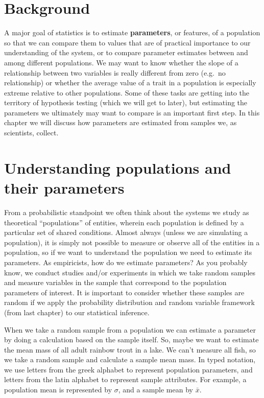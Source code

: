 \documentclass[]{book}
\begin{document}
\hypertarget{background-3}{%
\section{Background}\label{background-3}}

A major goal of statistics is to estimate \textbf{parameters}, or features, of a population so that we can compare them to values that are of practical importance to our understanding of the system, or to compare parameter estimates between and among different populations. We may want to know whether the slope of a relationship between two variables is really different from zero (e.g.~no relationship) or whether the average value of a trait in a population is especially extreme relative to other populations. Some of these tasks are getting into the territory of hypothesis testing (which we will get to later), but estimating the parameters we ultimately may want to compare is an important first step. In this chapter we will discuss how parameters are estimated from samples we, as scientists, collect.

\hypertarget{understanding-populations-and-their-parameters}{%
\section{Understanding populations and their parameters}\label{understanding-populations-and-their-parameters}}

From a probabilistic standpoint we often think about the systems we study as theoretical ``populations'' of entities, wherein each population is defined by a particular set of shared conditions. Almost always (unless we are simulating a population), it is simply not possible to measure or observe all of the entities in a population, so if we want to understand the population we need to estimate its parameters. As empiricists, how do we estimate parameters? As you probably know, we conduct studies and/or experiments in which we take random samples and measure variables in the sample that correspond to the population parameters of interest. It is important to consider whether these samples are random if we apply the probability distribution and random variable framework (from last chapter) to our statistical inference.

When we take a random sample from a population we can estimate a parameter by doing a calculation based on the sample itself. So, maybe we want to estimate the mean mass of all adult rainbow trout in a lake. We can't measure all fish, so we take a random sample and calculate a sample mean mass. In typed notation, we use letters from the greek alphabet to represent population parameters, and letters from the latin alphabet to represent sample attributes. For example, a population mean is represented by \(\sigma\), and a sample mean by \(\bar{x}\).
\end{document}
